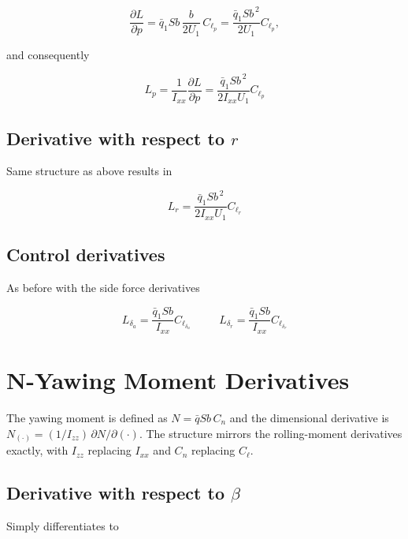 \documentclass[11pt]{article}
\newcommand{\qbar}{\bar{q}}
\newcommand{\Ixx}{I_{xx}}
\newcommand{\Izz}{I_{zz}}
\newcommand{\dd}[2]{\dfrac{\partial #1}{\partial #2}}
\begin{document}
\begin{equation}\label{eq:equation_42}
\dd{L}{p} = \qbar_1 S b\,\frac{b}{2U_1}\,C_{\ell_p}
         = \frac{\qbar_1 S b^{\,2}}{2U_1}C_{\ell_p},
\end{equation}

and consequently

\begin{equation}\label{eq:equation_43}
\boxed{\;L_p = \frac{1}{\Ixx}\dd{L}{p} = \frac{\qbar_1 S b^{\,2}}{2\Ixx U_1}C_{\ell_p}\;}
\end{equation}

\subsection{Derivative with respect to $r$}

Same structure as above results in

\begin{equation}\label{eq:equation_44}
\boxed{\;L_r = \frac{\qbar_1 S b^{\,2}}{2\Ixx U_1}C_{\ell_r}\;}
\end{equation}

\subsection{Control derivatives}

As before with the side force derivatives

\begin{equation}\label{eq:equation_45}
\boxed{\;L_{\delta_a} = \frac{\qbar_1 S b}{\Ixx}C_{\ell_{\delta_a}}\;}
\qquad
\boxed{\;L_{\delta_r} = \frac{\qbar_1 S b}{\Ixx}C_{\ell_{\delta_r}}\;}
\end{equation}

\section{N-Yawing Moment Derivatives}

The yawing moment is defined as $N = \qbar S b\,C_n$ and the dimensional derivative is
$N_{(\cdot)} = (1/\Izz)\,\partial N/\partial(\cdot)$.
The structure mirrors the rolling-moment derivatives exactly, with $\Izz$ replacing $\Ixx$ and $C_n$ replacing $C_\ell$.

\subsection{Derivative with respect to $\beta$}

Simply differentiates to
\end{document}
